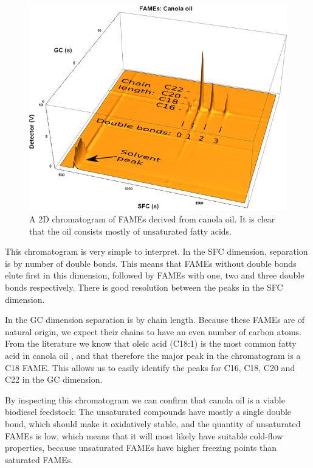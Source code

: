 \begin{figure}
\centering
\includegraphics[width=\textwidth]{Figures/Interpretation.png}
\decoRule

\caption[SFC×GC of canola oil]{A 2D chromatogram of FAMEs derived from
canola oil. It is clear that the oil consists mostly of unsaturated fatty
acids.}

\label{fig:2DCanola}
\end{figure}

This chromatogram is very simple to interpret. In the SFC dimension, separation
is by number of double bonds. This means that FAMEs without double bonds elute
first in this dimension, followed by FAMEs with one, two and three double bonds
respectively. There is good resolution between the peaks in the SFC dimension. 

In the GC dimension separation is by chain length. Because these FAMEs are of
natural origin, we expect their chains to have an even number of carbon atoms.
From the literature we know that oleic acid (C18:1) is the most common fatty
acid in canola oil \autocite{JFAOWHOCAC2019}, and that therefore the major peak
in the chromatogram is a C18 FAME. This allows us to easily identify the peaks
for C16, C18, C20 and C22 in the GC dimension.

By inspecting this chromatogram we can confirm that canola oil is a viable
biodiesel feedstock: The unsaturated compounds have mostly a single double bond,
which should make it oxidatively stable, and the quantity of unsaturated FAMEs is 
low, which means that it will most likely have suitable cold-flow properties,
because unsaturated FAMEs have higher freezing points than saturated FAMEs.


